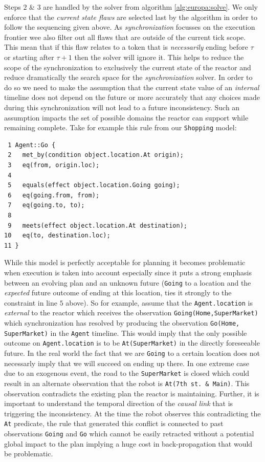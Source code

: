Steps $2$ \& $3$ are handled by the \eu solver from algorithm
\ref{alg:europa:solve}. We only enforce that the {\em current state
  flaws} are selected last by the algorithm in order to follow the
sequencing given above. As {\em synchronization} focusses on the
execution frontier wee also filter out all flaws that are outside of
the current tick scope. This mean that if this flaw relates to a token
that is {\em necessarily} ending before $\tau$ or starting after
$\tau+1$ then the solver will ignore it. This helps to reduce the
scope of the synchronization to exclusively the current state of the
reactor and reduce dramatically the search space for the {\em
  synchronization} solver. In order to do so we need to make the
assumption that the current state value of an {\em internal} timeline
does not depend on the future or more accurately that any choices made
during this synchronization will not lead to a future
inconsistency. Such an assumption impacts the set of possible domains
the reactor can support while remaining complete. Take for example
this rule from our \texttt{Shopping} model:

\begin{verbatim}
 1 Agent::Go {
 2   met_by(condition object.location.At origin);
 3   eq(from, origin.loc);
 4
 5   equals(effect object.location.Going going);
 6   eq(going.from, from);
 7   eq(going.to, to);
 8   
 9   meets(effect object.location.At destination);
10   eq(to, destination.loc);
11 }
\end{verbatim}

While this model is perfectly acceptable for planning it becomes
problematic when execution is taken into account especially since it
puts a strong emphasis between an evolving plan and an unknown future
(\texttt{Going} to a location and the {\em expected} future outcome of
ending at this location, ties it strongly to the constraint in line
$5$ above).  So for example, assume that the \texttt{Agent.location}
is {\em external} to the reactor which receives the observation
\texttt{Going(Home,SuperMarket)} which synchronization has resolved by
producing the observation \texttt{Go(Home, SuperMarket)} in the
\texttt{Agent} timeline. This would imply that the only possible
outcome on \texttt{Agent.location} is to be \texttt{At(SuperMarket)}
in the directly foreseeable future. In the real world the fact that we
are \texttt{Going} to a certain location does not necessarly imply
that we will succeed on ending up there. In one extreme case due to an
exogenous event, the road to the \texttt{SuperMarket} is closed which
could result in an alternate observation that the robot is
\texttt{At(7th st. \& Main)}. This observation contradicts the
existing plan the reactor is maintaining. Further, it is important to
understand the temporal direction of the \emph{causal link} that is
triggering the inconsistency. At the time the robot observes this
contradicting the \texttt{At} predicate, the rule that generated this
conflict is connected to past observations \texttt{Going} and
\texttt{Go} which cannot be easily retracted without a potential
global impact to the plan implying a huge cost in back-propagation
that would be problematic.

